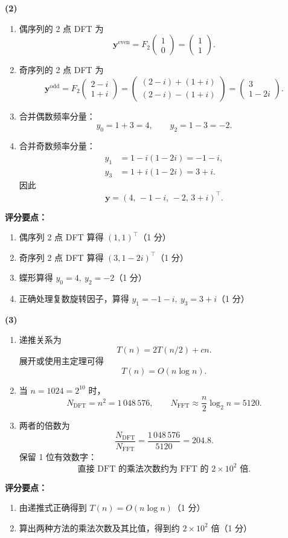 \documentclass[10pt,a4paper]{exam-zh}
\newcommand{\bvec}[1]{\boldsymbol{#1}}
\newenvironment{grading}
  {\par\smallskip\Needspace{5\baselineskip}\small
   \noindent\textcolor{gradingred}{\textbf{评分要点：}}
   \begin{enumerate}[label=\textcolor{gradingred}{\arabic*.},
     leftmargin=2.4em,itemsep=0pt,topsep=2pt,parsep=0pt]}
  {\end{enumerate}\smallskip}
\newcommand{\gradeitem}[2]{\item #1（\textcolor{gradingred}{#2 分}）}
\newenvironment{answersteps}
  {\begin{enumerate}[label=\textbf{步骤 \arabic*.},
    leftmargin=4.8em,labelsep=0.6em,itemsep=2pt,topsep=3pt,parsep=0pt]}
  {\end{enumerate}}
\newcommand{\subanswer}[1]{%
  \par\medskip\Needspace{6\baselineskip}\noindent\textbf{#1}\par}
\begin{document}
\begin{solution}
\subanswer{(2)}
\begin{answersteps}
  \item 偶序列的 2 点 DFT 为
  \[
  \bvec y^{\mathrm{even}}
  =F_2\begin{pmatrix}1\\0\end{pmatrix}
  =\begin{pmatrix}1\\1\end{pmatrix}.
  \]
  \item 奇序列的 2 点 DFT 为
  \[
  \bvec y^{\mathrm{odd}}
  =F_2\begin{pmatrix}2-i\\1+i\end{pmatrix}
  =\begin{pmatrix}
  (2-i)+(1+i)\\
  (2-i)-(1+i)
  \end{pmatrix}
  =\begin{pmatrix}3\\1-2i\end{pmatrix}.
  \]
  \item 合并偶数频率分量：
  \[
  y_0=1+3=4,
  \qquad
  y_2=1-3=-2.
  \]
  \item 合并奇数频率分量：
  \[
  \begin{aligned}
  y_1&=1-i(1-2i)=-1-i,\\
  y_3&=1+i(1-2i)=3+i.
  \end{aligned}
  \]
  因此
  \[
  \boxed{\bvec y=(4,\,-1-i,\,-2,\,3+i)^\top}.
  \]
\end{answersteps}
\begin{grading}
  \gradeitem{偶序列 2 点 DFT 算得 $(1,1)^\top$}{1}
  \gradeitem{奇序列 2 点 DFT 算得 $(3,1-2i)^\top$}{1}
  \gradeitem{蝶形算得 $y_0=4,\ y_2=-2$}{1}
  \gradeitem{正确处理复数旋转因子，算得 $y_1=-1-i,\ y_3=3+i$}{1}
\end{grading}

\subanswer{(3)}
\begin{answersteps}
  \item 递推关系为
  \[
  T(n)=2T(n/2)+cn.
  \]
  展开或使用主定理可得
  \[
  \boxed{T(n)=O(n\log n)}.
  \]
  \item 当 $n=1024=2^{10}$ 时，
  \[
  N_{\mathrm{DFT}}=n^2=1\,048\,576,
  \qquad
  N_{\mathrm{FFT}}\approx\frac n2\log_2n=5120.
  \]
  \item 两者的倍数为
  \[
  \frac{N_{\mathrm{DFT}}}{N_{\mathrm{FFT}}}
  =\frac{1\,048\,576}{5120}
  =204.8.
  \]
  保留 1 位有效数字：
  \[
  \boxed{\text{直接 DFT 的乘法次数约为 FFT 的 }2\times10^2\text{ 倍}}.
  \]
\end{answersteps}
\begin{grading}
  \gradeitem{由递推式正确得到 $T(n)=O(n\log n)$}{1}
  \gradeitem{算出两种方法的乘法次数及其比值，得到约 $2\times10^2$ 倍}{1}
\end{grading}
\end{solution}
\end{document}
